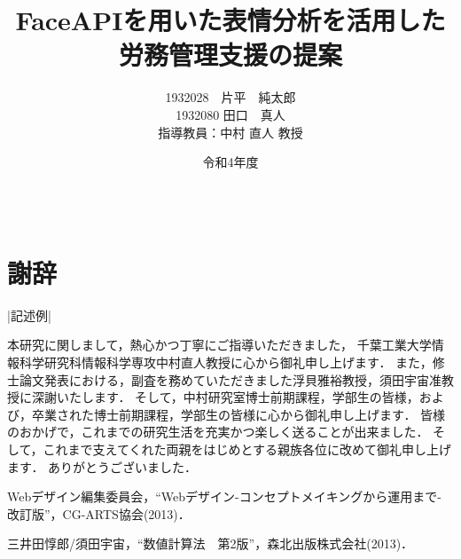 \documentclass[12pt]{jsreport}%
\title{FaceAPIを用いた表情分析を活用した\\労務管理支援の提案}					%
\author{1932028　片平　純太郎\\1932080 田口　真人\\\normalsize 指導教員：中村 直人 教授}	%
\date{令和4年度}                                %
\begin{document}
\maketitle                          %
\tableofcontents                 %
\listoffigures				 %
\listoftables				 %

\baselineskip 20pt               %


\clearpage
{}


%








\newpage



\chapter*{　\\謝辞}
|記述例|

本研究に関しまして，熱心かつ丁寧にご指導いただきました，
千葉工業大学情報科学研究科情報科学専攻中村直人教授に心から御礼申し上げます．
また，修士論文発表における，副査を務めていただきました浮貝雅裕教授，須田宇宙准教授に深謝いたします．
そして，中村研究室博士前期課程，学部生の皆様，および，卒業された博士前期課程，学部生の皆様に心から御礼申し上げます．
皆様のおかげで，これまでの研究生活を充実かつ楽しく送ることが出来ました．
そして，これまで支えてくれた両親をはじめとする親族各位に改めて御礼申し上げます．
ありがとうございました．


\begin{thebibliography}{99}

Webデザイン編集委員会，“Webデザイン-コンセプトメイキングから運用まで-　改訂版”，CG-ARTS協会(2013)．

三井田惇郎/須田宇宙，“数値計算法　第2版”，森北出版株式会社(2013)．


\end{thebibliography}
\end{document}
